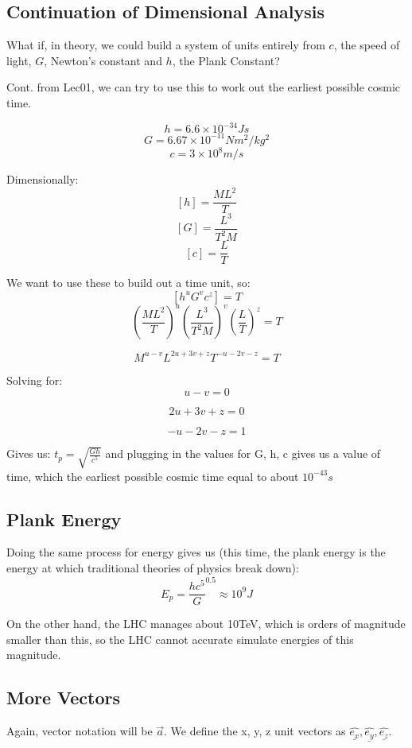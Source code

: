 \subsection*{Continuation of Dimensional Analysis}
What if, in theory, we could build a system of units entirely from $c$, the speed of light, $G$, Newton's constant and $h$, the Plank Constant?

Cont. from Lec01, we can try to use this to work out the earliest possible cosmic time.

\[
    h = 6.6 \times 10^{-34}Js
\]
\[
    G = 6.67 \times 10^{-11} N m^2 / kg^2
\]
\[
    c = 3 \times 10^8 m/s
\]

Dimensionally:
\[
    [h] = \frac{ML^2}{T}
\]
\[
    [G] = \frac{L^3}{T^2 M}
\]
\[
    [c] = \frac{L}{T}
\]

We want to use these to build out a time unit, so:
\[
    [h^u G^v c^z] = T
\]
\[
    \left(\frac{ML^2}{T}\right)^u \left(\frac{L^3}{T^2 M}\right)^v \left(\frac{L}{T}\right)^z = T
\]

\[
    M^{u-v} L^{2u + 3v + z} T^{-u - 2v -z} = T
\]

Solving for:
\[
    u-v = 0
\]

\[
    2u+3v + z = 0
\]

\[
    -u - 2v - z = 1
\]

Gives us:
$t_p = \sqrt{\frac{Gh}{c^5}}$ and plugging in the values for G, h, c gives us a value of time, which the earliest possible cosmic time equal to about $10^{-43}s$


\subsection*{Plank Energy}
Doing the same process for energy gives us (this time, the plank energy is the energy at which traditional theories of physics break down):
\[
    E_p = \frac{hc^5}{G}^{0.5} \approx 10^9 J
\]

On the other hand, the LHC manages about 10TeV, which is orders of magnitude smaller than this, so the LHC cannot accurate simulate energies of this magnitude.

\subsection*{More Vectors}
Again, vector notation will be $\vec{a}$. We define the x, y, z unit vectors as $\underline{\hat{e_x}}, \underline{\hat{e_y}}, \underline{\hat{e_z}}$.

